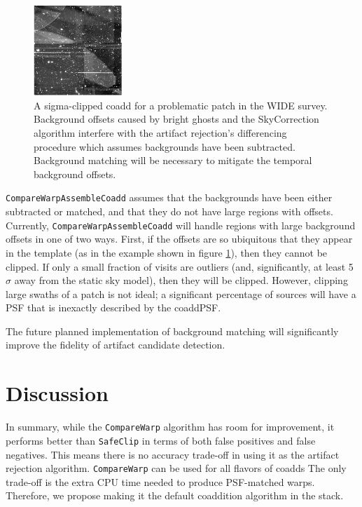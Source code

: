 \documentclass[DM,authoryear,toc]{lsstdoc}
\begin{document}
\begin{figure}
\begin{centering}
\includegraphics[width=0.3\textwidth]{figures/templateWBackgrounds.png}
\par\end{centering}
\caption{\label{fig:backgroundOffsets}  A sigma-clipped coadd for a problematic patch in the WIDE survey.  Background offsets caused by bright ghosts and the SkyCorrection algorithm interfere with the artifact rejection's differencing procedure which assumes backgrounds have been subtracted. Background matching will be necessary to mitigate the temporal background offsets.}
\end{figure}

\texttt{CompareWarpAssembleCoadd}  assumes that the backgrounds have been either subtracted or matched, and that they do not have large regions with offsets.
 Currently, \texttt{CompareWarpAssembleCoadd}  will handle regions with large background offsets in one of two ways.
 First, if the offsets are so ubiquitous that they appear in the template (as in the example shown in figure \ref{fig:backgroundOffsets}), then they cannot be clipped.
 If only a small fraction of visits are outliers  (and, significantly, at least 5$\sigma$ away from the static sky model), then they will be clipped.
 However, clipping large swaths of a patch is not ideal; a significant percentage of sources will have a PSF that is inexactly described by the coaddPSF.

The future planned implementation of background matching will significantly improve the fidelity of artifact candidate detection.

\section{Discussion}

In summary, while the \texttt{CompareWarp} algorithm has room for improvement, it performs better than \texttt{SafeClip} in terms of both false positives and false negatives.
This means there is no accuracy trade-off in using it as the artifact rejection algorithm.
\texttt{CompareWarp} can be used for all flavors of coadds
The only trade-off is the extra CPU time needed to produce PSF-matched warps.
Therefore, we propose making it the default coaddition algorithm in the stack.


\end{document}
